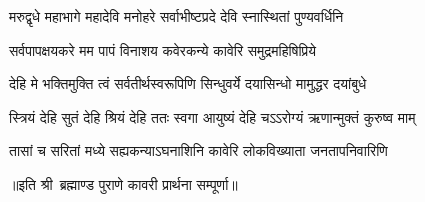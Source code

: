 

\twolineshloka
{मरुद्वृधे महाभागे महादेवि मनोहरे}
{सर्वाभीष्टप्रदे देवि स्नास्थितां पुण्यवर्धिनि}%

\twolineshloka
{सर्वपापक्षयकरे मम पापं विनाशय}
{कवेरकन्ये कावेरि समुद्रमहिषिप्रिये}%

\twolineshloka
{देहि मे भक्तिमुक्ति त्वं सर्वतीर्थस्वरूपिणि}
{सिन्धुवर्ये दयासिन्धो मामुद्धर दयांबुधे}%

\twolineshloka
{स्त्रियं देहि सुतं देहि श्रियं देहि ततः स्वगा}
{आयुष्यं देहि चऽऽरोग्यं ऋणान्मुक्तं कुरुष्व माम्}%

\twolineshloka
{तासां च सरितां मध्ये सह्यकन्याऽघनाशिनि}
{कावेरि लोकविख्याता जनतापनिवारिणि}%

॥इति श्री~ब्रह्माण्ड पुराणे कावरी प्रार्थना सम्पूर्णा॥